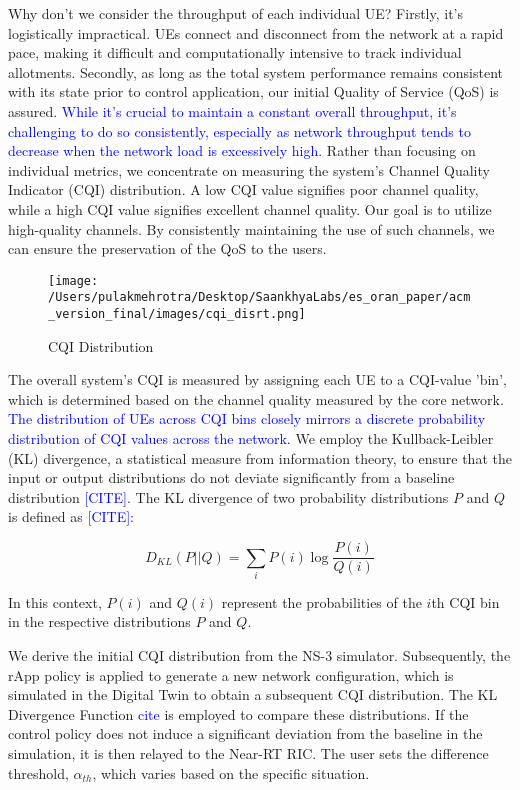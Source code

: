 Why don't we consider the throughput of each individual UE? Firstly, it's logistically impractical. 
UEs connect and disconnect from the network at a rapid pace, making it difficult and computationally intensive to track individual allotments.
Secondly, as long as the total system performance remains consistent with its state prior to control application, our initial Quality of Service (QoS) is assured.
\textcolor{blue}{While it's crucial to maintain a constant overall throughput, it's challenging to do so consistently, especially as network throughput tends to decrease when the network load is excessively high.}
Rather than focusing on individual metrics, we concentrate on measuring the system's Channel Quality Indicator (CQI) distribution. 
A low CQI value signifies poor channel quality, while a high CQI value signifies excellent channel quality. 
Our goal is to utilize high-quality channels. By consistently maintaining the use of such channels, we can ensure the preservation of the QoS to the users.

\begin{figure}[ht]
    \centering
    \texttt{[image: /Users/pulakmehrotra/Desktop/SaankhyaLabs/es\_oran\_paper/acm\_version\_final/images/cqi\_disrt.png]}
    \caption{CQI Distribution}
    \label{fig:cqi_distr}
    \end{figure}

The overall system's CQI is measured by assigning each UE to a CQI-value 'bin', which is determined based on the channel quality measured by the core network.
\textcolor{blue}{The distribution of UEs across CQI bins closely mirrors a discrete probability distribution of CQI values across the network.}
We employ the Kullback-Leibler (KL) divergence, a statistical measure from information theory, to ensure that the input or output distributions do not deviate significantly from a baseline distribution \textcolor{blue}{[CITE]}.
The KL divergence of two probability distributions $P$ and $Q$ is defined as \textcolor{blue}{[CITE]}:

\begin{equation}
D_{KL}(P || Q) = \sum_{i} P(i) \log \frac{P(i)}{Q(i)}
\end{equation}

In this context, $P(i)$ and $Q(i)$ represent the probabilities of the $i$th CQI bin in the respective distributions $P$ and $Q$.

We derive the initial CQI distribution from the NS-3 simulator. 
Subsequently, the rApp policy is applied to generate a new network configuration, which is simulated in the Digital Twin to obtain a subsequent CQI distribution. 
The KL Divergence Function \textcolor{blue}{cite} is employed to compare these distributions. 
If the control policy does not induce a significant deviation from the baseline in the simulation, it is then relayed to the Near-RT RIC. 
The user sets the difference threshold, $\alpha_{th}$, which varies based on the specific situation.

